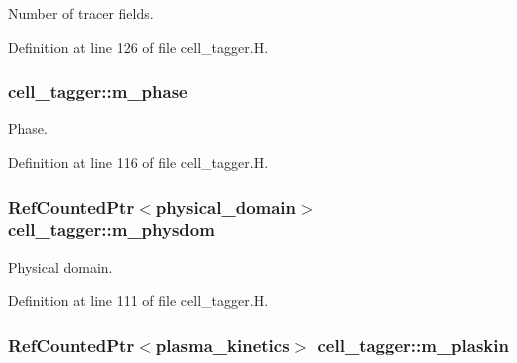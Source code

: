Number of tracer fields. 



Definition at line 126 of file cell\+\_\+tagger.\+H.

\subsubsection[{\texorpdfstring{m\+\_\+phase}{m_phase}}]{ cell\+\_\+tagger\+::m\+\_\+phase\hspace{0.3cm}{\ttfamily [protected]}}\hypertarget{classcell__tagger_a1495ba566a901891655afcc35ac05a3f}{}\label{classcell__tagger_a1495ba566a901891655afcc35ac05a3f}


Phase. 



Definition at line 116 of file cell\+\_\+tagger.\+H.

\subsubsection[{\texorpdfstring{m\+\_\+physdom}{m_physdom}}]{\setlength{\rightskip}{0pt plus 5cm}Ref\+Counted\+Ptr$<${\bf physical\+\_\+domain}$>$ cell\+\_\+tagger\+::m\+\_\+physdom\hspace{0.3cm}{\ttfamily [protected]}}\hypertarget{classcell__tagger_ad176575b6ece539b8131a1aa12e4f2f7}{}\label{classcell__tagger_ad176575b6ece539b8131a1aa12e4f2f7}


Physical domain. 



Definition at line 111 of file cell\+\_\+tagger.\+H.

\subsubsection[{\texorpdfstring{m\+\_\+plaskin}{m_plaskin}}]{\setlength{\rightskip}{0pt plus 5cm}Ref\+Counted\+Ptr$<${\bf plasma\+\_\+kinetics}$>$ cell\+\_\+tagger\+::m\+\_\+plaskin\hspace{0.3cm}{\ttfamily [protected]}}\hypertarget{classcell__tagger_a1075ac078698fb7abb5c011a06f32a5c}{}\label{classcell__tagger_a1075ac078698fb7abb5c011a06f32a5c}


